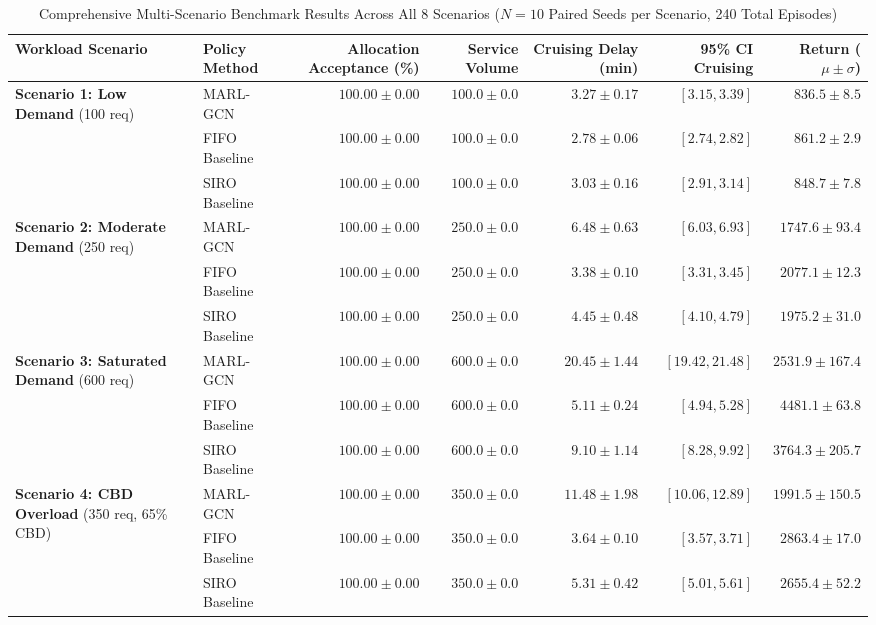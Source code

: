 \documentclass[journal]{IEEEtran}
\begin{document}
\begin{table}[t]
\caption{Comprehensive Multi-Scenario Benchmark Results Across All 8 Scenarios ($N=10$ Paired Seeds per Scenario, 240 Total Episodes)}
\label{tab:benchmarks_summary}
\centering
\begin{tabular}{llrrrrr}
\toprule
\textbf{Workload Scenario} & \textbf{Policy Method} & \textbf{Allocation Acceptance (\%)} & \textbf{Service Volume} & \textbf{Cruising Delay (min)} & \textbf{95\% CI Cruising} & \textbf{Return ($\mu \pm \sigma$)} \\
\midrule
\multirow{3}{*}{\textbf{Scenario 1: Low Demand} (100 req)} 
& MARL-GCN & $100.00 \pm 0.00$ & $100.0 \pm 0.0$ & $3.27 \pm 0.17$ & $[3.15, 3.39]$ & $836.5 \pm 8.5$ \\
& FIFO Baseline & $100.00 \pm 0.00$ & $100.0 \pm 0.0$ & $2.78 \pm 0.06$ & $[2.74, 2.82]$ & $861.2 \pm 2.9$ \\
& SIRO Baseline & $100.00 \pm 0.00$ & $100.0 \pm 0.0$ & $3.03 \pm 0.16$ & $[2.91, 3.14]$ & $848.7 \pm 7.8$ \\
\midrule
\multirow{3}{*}{\textbf{Scenario 2: Moderate Demand} (250 req)} 
& MARL-GCN & $100.00 \pm 0.00$ & $250.0 \pm 0.0$ & $6.48 \pm 0.63$ & $[6.03, 6.93]$ & $1747.6 \pm 93.4$ \\
& FIFO Baseline & $100.00 \pm 0.00$ & $250.0 \pm 0.0$ & $3.38 \pm 0.10$ & $[3.31, 3.45]$ & $2077.1 \pm 12.3$ \\
& SIRO Baseline & $100.00 \pm 0.00$ & $250.0 \pm 0.0$ & $4.45 \pm 0.48$ & $[4.10, 4.79]$ & $1975.2 \pm 31.0$ \\
\midrule
\multirow{3}{*}{\textbf{Scenario 3: Saturated Demand} (600 req)} 
& MARL-GCN & $100.00 \pm 0.00$ & $600.0 \pm 0.0$ & $20.45 \pm 1.44$ & $[19.42, 21.48]$ & $2531.9 \pm 167.4$ \\
& FIFO Baseline & $100.00 \pm 0.00$ & $600.0 \pm 0.0$ & $5.11 \pm 0.24$ & $[4.94, 5.28]$ & $4481.1 \pm 63.8$ \\
& SIRO Baseline & $100.00 \pm 0.00$ & $600.0 \pm 0.0$ & $9.10 \pm 1.14$ & $[8.28, 9.92]$ & $3764.3 \pm 205.7$ \\
\midrule
\multirow{3}{*}{\textbf{Scenario 4: CBD Overload} (350 req, 65\% CBD)} 
& MARL-GCN & $100.00 \pm 0.00$ & $350.0 \pm 0.0$ & $11.48 \pm 1.98$ & $[10.06, 12.89]$ & $1991.5 \pm 150.5$ \\
& FIFO Baseline & $100.00 \pm 0.00$ & $350.0 \pm 0.0$ & $3.64 \pm 0.10$ & $[3.57, 3.71]$ & $2863.4 \pm 17.0$ \\
& SIRO Baseline & $100.00 \pm 0.00$ & $350.0 \pm 0.0$ & $5.31 \pm 0.42$ & $[5.01, 5.61]$ & $2655.4 \pm 52.2$ \\

\end{tabular}
\end{table}
\end{document}
